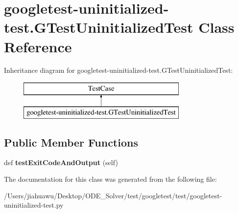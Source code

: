 \hypertarget{classgoogletest-uninitialized-test_1_1_g_test_uninitialized_test}{}\section{googletest-\/uninitialized-\/test.G\+Test\+Uninitialized\+Test Class Reference}
\label{classgoogletest-uninitialized-test_1_1_g_test_uninitialized_test}
Inheritance diagram for googletest-\/uninitialized-\/test.G\+Test\+Uninitialized\+Test\+:\begin{figure}[H]
\begin{center}
\leavevmode
\includegraphics[height=2.000000cm]{classgoogletest-uninitialized-test_1_1_g_test_uninitialized_test}
\end{center}
\end{figure}
\subsection*{Public Member Functions}
\begin{DoxyCompactItemize}
\item 
\mbox{\label{classgoogletest-uninitialized-test_1_1_g_test_uninitialized_test_aa3c5445f3d94a94d9b252fd64f05e4a0}} 
def {\bfseries test\+Exit\+Code\+And\+Output} (self)
\end{DoxyCompactItemize}


The documentation for this class was generated from the following file\+:\begin{DoxyCompactItemize}
\item 
/\+Users/jiahuawu/\+Desktop/\+O\+D\+E\+\_\+\+Solver/test/googletest/test/googletest-\/uninitialized-\/test.\+py\end{DoxyCompactItemize}
